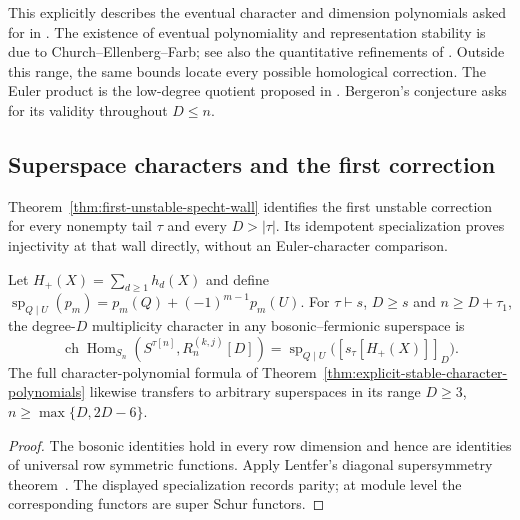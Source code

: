 This explicitly describes the eventual character and dimension
polynomials asked for in
\cite[Problems~1.10 and~1.12]{ChurchEllenbergFarb2015}.
The existence of eventual polynomiality and representation
stability is due to Church--Ellenberg--Farb; see also the
quantitative refinements of \cite{Bahran2024,Borisov2026}.
Outside this range, the same bounds locate every possible homological
correction.  The Euler product is the low-degree quotient proposed in
\cite[Section~4, equation~(33)]{Bergeron2013}.
Bergeron's conjecture asks for its validity throughout $D\le n$.





\subsection{Superspace characters and the first correction}

Theorem~\ref{thm:first-unstable-specht-wall} identifies the first
unstable correction for every nonempty tail $\tau$ and every
$D>|\tau|$. Its idempotent specialization proves injectivity at
that wall directly, without an Euler-character comparison.

\begin{corollary}
\label{cor:stable-superspace-characters}
Let $H_+(X)=\sum_{d\ge1}h_d(X)$ and define
$\operatorname{sp}_{Q\mid U}(p_m)=p_m(Q)+(-1)^{m-1}p_m(U)$.
For $\tau\vdash s$, $D\ge s$ and $n\ge D+\tau_1$, the
degree-$D$ multiplicity character in any bosonic--fermionic superspace is
\[
 \operatorname{ch}\operatorname{Hom}_{S_n}
 (S^{\tau[n]},R_n^{(k,j)}[D])
 =\operatorname{sp}_{Q\mid U}\bigl([s_\tau[H_+(X)]]_D\bigr).
\]
The full character-polynomial formula of
Theorem~\ref{thm:explicit-stable-character-polynomials} likewise
transfers to arbitrary superspaces in its range
$D\ge3$, $n\ge\max\{D,2D-6\}$.
\end{corollary}
\begin{proof}
The bosonic identities hold in every row dimension and hence are
identities of universal row symmetric functions. Apply Lentfer's
diagonal supersymmetry theorem~\cite[Theorem~1.2 and Corollary~1.3]{Lentfer}.
The displayed specialization records parity; at module level the
corresponding functors are super Schur functors.
\end{proof}
